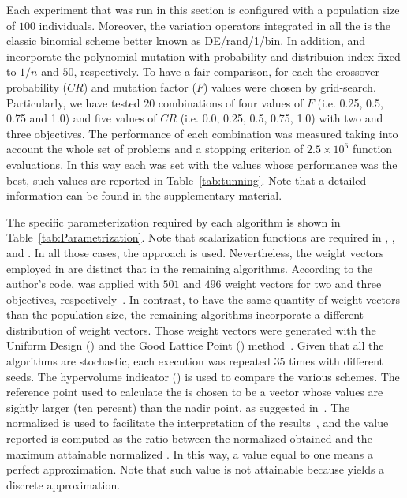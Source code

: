 Each experiment that was run in this section is configured with a population size of $100$ individuals.
%
Moreover, the variation operators integrated in all the \MOEAS{} is the classic binomial \DE{} scheme better known as DE/rand/1/bin.
%
In addition, \MOEAD{} and \VSDMOEAD{} incorporate the polynomial mutation with probability and distribuion index fixed to $1/n$ and $50$, respectively.
%
To have a fair comparison, for each \MOEA{} the crossover probability ($CR$) and mutation factor ($F$) values were chosen by grid-search.
%
Particularly, we have tested $20$ combinations of four values of $F$ (i.e. 0.25, 0.5, 0.75 and 1.0) and five values of $CR$ (i.e. 0.0, 0.25, 0.5, 0.75, 1.0) with two and three objectives.
%
The performance of each combination was measured taking into account the whole set of problems and a stopping criterion of  $2.5 \times 10^{6}$ function evaluations.
%
In this way each \MOEA{} was set with the values whose performance was the best, such values are reported in Table~\ref{tab:tunning}. Note that a detailed information can be found in the supplementary material.
%

%
The specific parameterization required by each algorithm is shown in Table~\ref{tab:Parametrization}.
%
Note that scalarization functions are required in \MOEADDE{}, \RMOEA{}, \NSGAIII{} and \VSDMOEAD{}.
%
In all those cases, the \ASF{} approach is used.
%
Nevertheless, the weight vectors employed in \RMOEA{} are distinct that in the remaining algorithms.
%
According to the author's code, \RMOEA{} was applied with $501$ and $496$ weight vectors for two and three objectives, respectively~\cite{trautmann2013r2}.
%
In contrast, to have the same quantity of weight vectors than the population size, the remaining algorithms incorporate a different distribution of weight vectors.
%
Those weight vectors were generated with the Uniform Design (\UD{}) and the Good Lattice Point (\GLP{}) method~\cite{tan2013moea1, tan2013moea2}.
%
Given that all the algorithms are stochastic, each execution was repeated $35$ times with different seeds.
%
The hypervolume indicator (\HV{}) is used to compare the various schemes.
%
The reference point used to calculate the \HV{} is chosen to be a vector whose values are sightly larger (ten percent) than the nadir point, as suggested in~\cite{ishibuchi2017reference}.
%
The normalized \HV{} is used to facilitate the interpretation of the results~\cite{li2014evolutionary}, and the value reported is computed as the ratio between the normalized \HV{} obtained and the maximum attainable normalized \HV{}.
%
In this way, a value equal to one means a perfect approximation.
%
Note that such value is not attainable because \MOEAS{} yields a discrete approximation.
%

